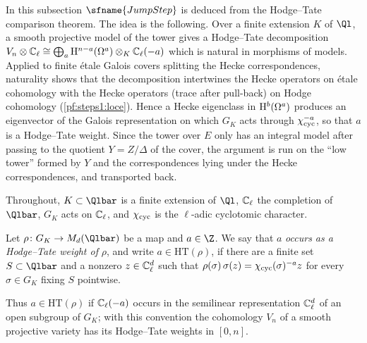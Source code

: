 In this subsection $\sfname{JumpStep}$ is deduced from the Hodge--Tate comparison theorem. The idea is the
following. Over a finite extension $K$ of $\Ql$, a smooth projective model of the tower gives a
Hodge--Tate decomposition $V_n\otimes\mathbb{C}_\ell\cong\bigoplus_a\mathrm{H}^{n-a}(\Omega^a)\otimes_K\mathbb{C}_\ell(-a)$ which is
natural in morphisms of models. Applied to finite \'etale Galois covers splitting the Hecke correspondences,
naturality shows that the decomposition intertwines the Hecke operators on \'etale cohomology with the Hecke
operators (trace after pull-back) on Hodge cohomology (\cref{pf:steps1:loce}). Hence a Hecke eigenclass in
$\mathrm{H}^b(\Omega^a)$ produces an eigenvector of the Galois representation on which $G_K$ acts through
$\chi_{\mathrm{cyc}}^{-a}$, so that $a$ is a Hodge--Tate weight. Since the tower over $E$ only has an integral model
after passing to the quotient $Y=Z/\Delta$ of the cover, the argument is run on the ``low tower'' formed by
$Y$ and the correspondences lying under the Hecke correspondences, and transported back.

Throughout, $K\subset\Qlbar$ is a finite extension of $\Ql$, $\mathbb{C}_\ell$ the completion of $\Qlbar$, $G_K$ acts
on $\mathbb{C}_\ell$, and $\chi_{\mathrm{cyc}}$ is the $\ell$-adic cyclotomic character.

\begin{definition}\label{pf:steps1:def:htocc}
Let $\rho\colon G_K\to M_d(\Qlbar)$ be a map and $a\in\Z$. We say that $a$ \emph{occurs as a Hodge--Tate
weight of} $\rho$, and write $a\in\mathrm{HT}(\rho)$, if there are a finite set $S\subset\Qlbar$ and a nonzero
$z\in\mathbb{C}_\ell^d$ such that $\rho(\sigma)\,\sigma(z)=\chi_{\mathrm{cyc}}(\sigma)^{-a}z$ for every $\sigma\in G_K$ fixing
$S$ pointwise. 
\end{definition}

Thus $a\in\mathrm{HT}(\rho)$ if $\mathbb{C}_\ell(-a)$ occurs in the semilinear representation $\mathbb{C}_\ell^d$ of an
open subgroup of $G_K$; with this convention the cohomology $V_n$ of a smooth projective variety has its
Hodge--Tate weights in $[0,n]$.

